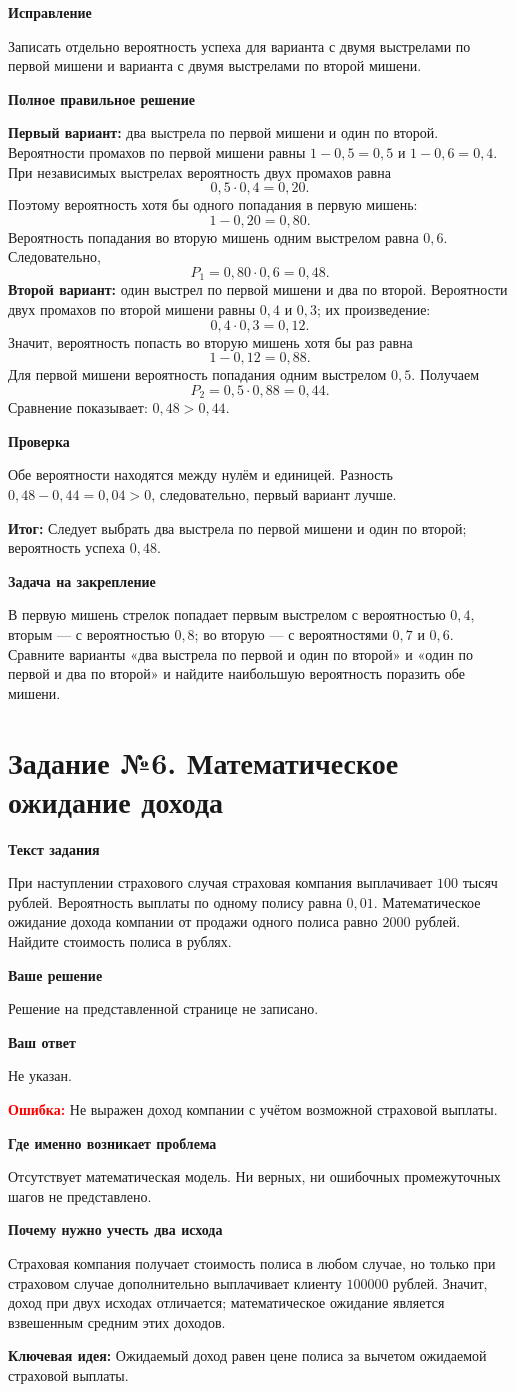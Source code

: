 \documentclass[11pt,a4paper]{article}
\newcommand{\task}[2]{\newpage\phantomsection\label{task:#1}\section*{Задание №#1. #2}}
\newcommand{\err}[1]{\par\textcolor{red}{\textbf{Ошибка:}} #1\par}
\newcommand{\keyidea}[1]{\par\textcolor{blue!60!black}{\textbf{Ключевая идея:}} #1\par}
\newcommand{\conclusion}[1]{\par\textcolor{teal!60!black}{\textbf{Итог:}} #1\par}
\newcommand{\itemhead}[1]{\par\medskip\textbf{#1}\par}
\begin{document}
\itemhead{Исправление}
Записать отдельно вероятность успеха для варианта с двумя выстрелами по первой мишени и варианта с двумя выстрелами по второй мишени.
\itemhead{Полное правильное решение}
\textbf{Первый вариант:} два выстрела по первой мишени и один по второй.
Вероятности промахов по первой мишени равны $1-0{,}5=0{,}5$ и $1-0{,}6=0{,}4$.
При независимых выстрелах вероятность двух промахов равна
\[
0{,}5\cdot0{,}4=0{,}20.
\]
Поэтому вероятность хотя бы одного попадания в первую мишень:
\[
1-0{,}20=0{,}80.
\]
Вероятность попадания во вторую мишень одним выстрелом равна $0{,}6$.
Следовательно,
\[
P_1=0{,}80\cdot0{,}6=0{,}48.
\]
\textbf{Второй вариант:} один выстрел по первой мишени и два по второй.
Вероятности двух промахов по второй мишени равны $0{,}4$ и $0{,}3$; их произведение:
\[
0{,}4\cdot0{,}3=0{,}12.
\]
Значит, вероятность попасть во вторую мишень хотя бы раз равна
\[
1-0{,}12=0{,}88.
\]
Для первой мишени вероятность попадания одним выстрелом $0{,}5$. Получаем
\[
P_2=0{,}5\cdot0{,}88=0{,}44.
\]
Сравнение показывает: $0{,}48>0{,}44$.
\itemhead{Проверка}
Обе вероятности находятся между нулём и единицей. Разность $0{,}48-0{,}44=0{,}04>0$, следовательно, первый вариант лучше.
\conclusion{Следует выбрать два выстрела по первой мишени и один по второй; вероятность успеха $0{,}48$.}
\itemhead{Задача на закрепление}
В первую мишень стрелок попадает первым выстрелом с вероятностью $0{,}4$, вторым --- с вероятностью $0{,}8$; во вторую --- с вероятностями $0{,}7$ и $0{,}6$. Сравните варианты «два выстрела по первой и один по второй» и «один по первой и два по второй» и найдите наибольшую вероятность поразить обе мишени.

\task{6}{Математическое ожидание дохода}
\itemhead{Текст задания}
При наступлении страхового случая страховая компания выплачивает $100$ тысяч рублей. Вероятность выплаты по одному полису равна $0{,}01$. Математическое ожидание дохода компании от продажи одного полиса равно $2000$ рублей. Найдите стоимость полиса в рублях.
\itemhead{Ваше решение}
Решение на представленной странице не записано.
\itemhead{Ваш ответ}
Не указан.
\err{Не выражен доход компании с учётом возможной страховой выплаты.}
\itemhead{Где именно возникает проблема}
Отсутствует математическая модель. Ни верных, ни ошибочных промежуточных шагов не представлено.
\itemhead{Почему нужно учесть два исхода}
Страховая компания получает стоимость полиса в любом случае, но только при страховом случае дополнительно выплачивает клиенту $100000$ рублей. Значит, доход при двух исходах отличается; математическое ожидание является взвешенным средним этих доходов.
\keyidea{Ожидаемый доход равен цене полиса за вычетом ожидаемой страховой выплаты.}
\end{document}
